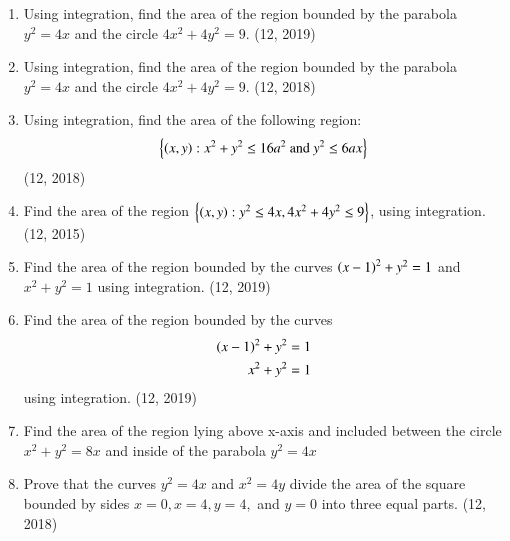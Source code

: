 \begin{enumerate}[label=\thesubsection.\arabic*,ref=\thesubsection.\theenumi]
%
\item Using integration, find the area of the region bounded by the parabola $y^{2}=4x$ and the circle $4x^{2}+4y^{2}=9$. \hfill (12, 2019)
\item Using integration, find the area of the region bounded by the parabola $y^{2}=4x$ and the circle $4x^{2}+4y^{2}=9$. \hfill (12, 2018)
\item Using integration, find the area of the following region:
  \begin{align*}
  \left\{\left(x,y\right):x^{2}+y^{2}\leq 16a^{2} ~\text{and}~ y^{2}\leq 6ax\right\}
  \end{align*}
  \hfill (12, 2018)
\item Find the area of the region $\left\{\left(x,y\right) : y^2 \leq 4x, 4x^2+4y^2 \leq 9\right\}$, using integration.
\hfill (12, 2015)
\item Find the area of the region bounded by the curves $\left(x-1\right)^{2} +y^{2} = 1$ and $ x^{2}+y^{2}  = 1$ using integration.
\hfill (12, 2019)
\item Find the area of the region bounded by the curves  
\begin{align*}
\left(x-1\right)^2 +y^2=1 \\  x^2+y^2=1
\end{align*}
using integration.
\hfill (12, 2019)
\item Find the area of the region lying above x-axis and included between the circle $x^2+y^2 = 8x$ and inside of the parabola $ y^2 = 4x$
\item Prove that the curves $y^2 = 4x$ and $x^2 = 4y$ divide the area of the square bounded by sides $x=0,x=4,y=4,$ and $y=0$ into three equal parts.
\hfill (12, 2018)

\end{enumerate}
